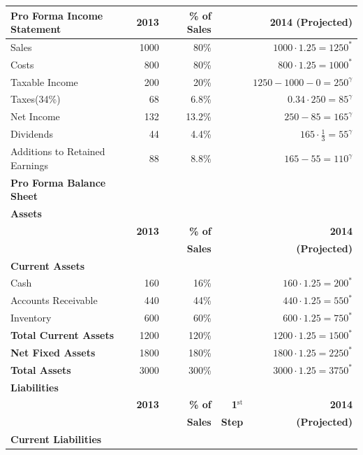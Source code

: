 \documentclass{letter}
\begin{document}
\begin{tabular}{l r r r r}
    \toprule
    \textbf{Pro Forma Income Statement} & \textbf{2013} & \textbf{\% of Sales} & & \textbf{2014 (Projected)} \\
    \midrule
    Sales & 1000 & 80\% & & $1000 \cdot 1.25 = 1250^*$ \\
    Costs & 800 & 80\% & & $800 \cdot 1.25 = 1000^*$ \\
    Taxable Income & 200 & 20\% & & $1250 - 1000 - 0 = 250^{\gamma}$ \\
    Taxes(34\%) & 68 & 6.8\% & & $0.34 \cdot 250 = 85^{\gamma}$ \\
    Net Income & 132 & 13.2\% & & $250 - 85 = 165^{\gamma}$ \\
    Dividends & 44 & 4.4\% & & $165 \cdot \frac{1}{3} = 55^{\gamma}$ \\
    Additions to Retained Earnings & 88 & 8.8\% & & $165 - 55 = 110^{\gamma}$ \\
    \bottomrule
    \toprule
    \textbf{Pro Forma Balance Sheet} \\
    \midrule
    \textbf{Assets} \\
    \midrule 
        & \textbf{2013} & \textbf{\% of} & & \textbf{2014} \\
        & & \textbf{Sales} & & \textbf{(Projected)} \\
        \textbf{Current Assets} \\
    Cash & 160 & 16\% & & $160 \cdot 1.25 = 200^*$ \\
    Accounts Receivable & 440 & 44\% & & $440 \cdot 1.25 = 550^*$ \\
    Inventory &  600 & 60\% & & $600 \cdot 1.25 = 750^*$ \\
    \textbf{Total Current Assets} & 1200 & 120\% & & $1200 \cdot 1.25 = 1500^*$ \\
    \midrule
    \textbf{Net Fixed Assets} & 1800 & 180\% & & $1800 \cdot 1.25 = 2250^*$ \\
    \midrule
    \textbf{Total Assets} & 3000 & 300\% & & $3000 \cdot 1.25 = 3750^*$ \\
    \toprule
    \textbf{Liabilities} \\
    \midrule 
                          & \textbf{2013} & \textbf{\% of} & \textbf{1$^{\text{st}}$} & \textbf{2014}\\
                          & & \textbf{Sales} & \textbf{Step} & \textbf{(Projected)} \\
                          \textbf{Current Liabilities} \\

\end{tabular}
\end{document}
